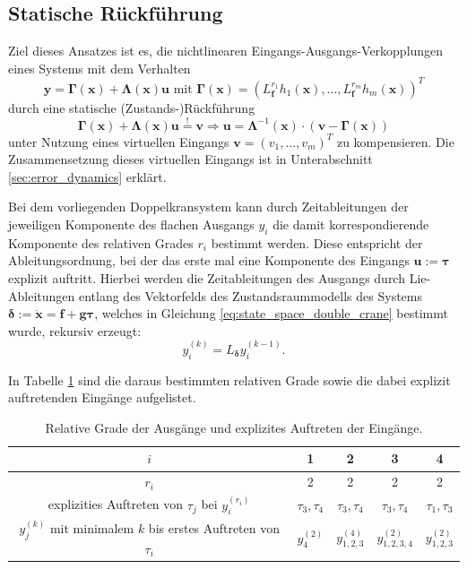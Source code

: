 \subsection{Statische Rückführung}
\label{sec:static_state_feedback}
Ziel dieses Ansatzes ist es, die nichtlinearen Eingangs-Ausgangs-Verkopplungen eines Systems mit dem Verhalten
\begin{equation}
	\mathbf{y} = \boldsymbol{\Gamma}(\mathbf{x}) + \boldsymbol{\Lambda}(\mathbf{x}) \boldsymbol{u} \text{ mit } \boldsymbol{\Gamma}(\mathbf{x}) = (L_{\mathbf{f}}^{r_1} h_1(\mathbf{x}), ..., L_{\mathbf{f}}^{r_m} h_m(\mathbf{x}))^T
\end{equation}
durch eine statische (Zustands-)Rückführung
\begin{equation}
	\label{eq:static_state_feedback}
	\boldsymbol{\Gamma}(\mathbf{x}) + \boldsymbol{\Lambda}(\mathbf{x}) \mathbf{u} \stackrel{!}{=} \mathbf{v} \Rightarrow \mathbf{u} = \boldsymbol{\Lambda}^{-1}(\mathbf{x}) \cdot (\mathbf{v} - \boldsymbol{\Gamma}(\mathbf{x}))
\end{equation}
unter Nutzung eines virtuellen Eingangs $\mathbf{v} = (v_1, ..., v_m)^T$ zu kompensieren. Die Zusammensetzung dieses virtuellen Eingangs ist in Unterabschnitt \ref{sec:error_dynamics} erklärt. \cite[S. 195]{NLRT_Roebenack}

Bei dem vorliegenden Doppelkransystem kann durch Zeitableitungen der jeweiligen Komponente des flachen Ausgangs $y_i$ die damit korrespondierende Komponente des relativen Grades $r_i$ bestimmt werden. Diese entspricht der Ableitungsordnung, bei der das erste mal eine Komponente des Eingangs $\mathbf{u}:=\boldsymbol{\tau}$ explizit auftritt. Hierbei werden die Zeitableitungen des Ausgangs durch Lie-Ableitungen entlang des Vektorfelds des Zustandsraummodells des Systems $\boldsymbol{\delta} := \dot{\mathbf{x}} = \mathbf{f} + \mathbf{g} \boldsymbol{\tau}$, welches in Gleichung \eqref{eq:state_space_double_crane} bestimmt wurde, rekursiv erzeugt: 
\begin{equation}
	\label{eq:Lie_time_deriv}
	y_i^{(k)} = L_{\boldsymbol{\delta}} y_i^{(k-1)} .
\end{equation}

In Tabelle \ref{tab:relative_degrees} sind die daraus bestimmten relativen Grade sowie die dabei explizit auftretenden Eingänge aufgelistet.
\begin{table}[htbp]%
	\centering
	\caption{Relative Grade der Ausgänge und explizites Auftreten der Eingänge.}
	\label{tab:relative_degrees}
	\begin{tabular}{c| c c c c} 
		\toprule
		$i$ & 1 & 2 & 3 & 4 \\ 
		\hline
		$r_i$ & 2 & 2 & 2 & 2\\ 
		\hline
		explizities Auftreten von $\tau_j$ bei $y_i^{(r_i)}$ & $\tau_3, \tau_4$ & $\tau_3, \tau_4$ & $\tau_3, \tau_4$ & $\tau_1, \tau_3$ \\
		\hline
		$y_j^{(k)}$ mit minimalem $k$ bis erstes Auftreten von $\tau_i$ & $y_4^{(2)}$ & $y_{1,2,3}^{(4)}$ & $y_{1,2,3,4}^{(2)}$ & $y_{1,2,3}^{(2)}$\\
		\bottomrule
	\end{tabular}
\end{table}

